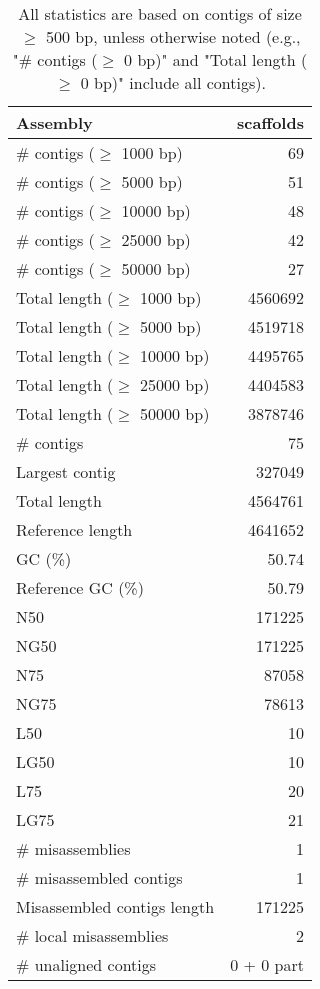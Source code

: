 \documentclass[12pt,a4paper]{article}
\begin{document}
\begin{table}[ht]
\begin{center}
\caption{All statistics are based on contigs of size $\geq$ 500 bp, unless otherwise noted (e.g., "\# contigs ($\geq$ 0 bp)" and "Total length ($\geq$ 0 bp)" include all contigs).}
\begin{tabular}{|l*{1}{|r}|}
\hline
Assembly & scaffolds \\ \hline
\# contigs ($\geq$ 1000 bp) & 69 \\ \hline
\# contigs ($\geq$ 5000 bp) & 51 \\ \hline
\# contigs ($\geq$ 10000 bp) & 48 \\ \hline
\# contigs ($\geq$ 25000 bp) & 42 \\ \hline
\# contigs ($\geq$ 50000 bp) & 27 \\ \hline
Total length ($\geq$ 1000 bp) & 4560692 \\ \hline
Total length ($\geq$ 5000 bp) & 4519718 \\ \hline
Total length ($\geq$ 10000 bp) & 4495765 \\ \hline
Total length ($\geq$ 25000 bp) & 4404583 \\ \hline
Total length ($\geq$ 50000 bp) & 3878746 \\ \hline
\# contigs & 75 \\ \hline
Largest contig & 327049 \\ \hline
Total length & 4564761 \\ \hline
Reference length & 4641652 \\ \hline
GC (\%) & 50.74 \\ \hline
Reference GC (\%) & 50.79 \\ \hline
N50 & 171225 \\ \hline
NG50 & 171225 \\ \hline
N75 & 87058 \\ \hline
NG75 & 78613 \\ \hline
L50 & 10 \\ \hline
LG50 & 10 \\ \hline
L75 & 20 \\ \hline
LG75 & 21 \\ \hline
\# misassemblies & 1 \\ \hline
\# misassembled contigs & 1 \\ \hline
Misassembled contigs length & 171225 \\ \hline
\# local misassemblies & 2 \\ \hline
\# unaligned contigs & 0 + 0 part \\ \hline

\end{tabular}
\end{center}
\end{table}
\end{document}
